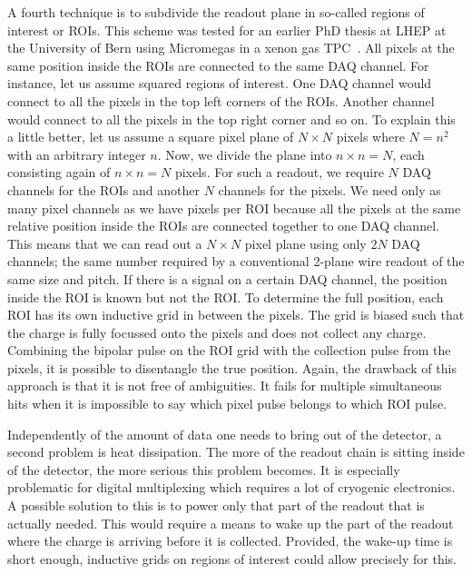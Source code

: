 A fourth technique is to subdivide the readout plane in so-called regions of interest or ROIs.
This scheme was tested for an earlier PhD thesis at LHEP at the University of Bern using Micromegas in a xenon gas TPC~\cite{maplesyrup}.
All pixels at the same position inside the ROIs are connected to the same DAQ channel.
For instance, let us assume squared regions of interest.
One DAQ channel would connect to all the pixels in the top left corners of the ROIs.
Another channel would connect to all the pixels in the top right corner and so on.
To explain this a little better, let us assume a square pixel plane of $N \times N$ pixels where $N = n ^ 2$ with an arbitrary integer $n$.
Now, we divide the plane into $n \times n = N$, each consisting again of $n \times n = N$ pixels.
For such a readout, we require $N$ DAQ channels for the ROIs and another $N$ channels for the pixels.
We need only as many pixel channels as we have pixels per ROI because all the pixels at the same relative position inside the ROIs are connected together to one DAQ channel.
This means that we can read out a $N \times N$ pixel plane using only $2 N$ DAQ channels; the same number required by a conventional 2-plane wire readout of the same size and pitch.
If there is a signal on a certain DAQ channel, the position inside the ROI is known but not the ROI.
To determine the full position, each ROI has its own inductive grid in between the pixels.
The grid is biased such that the charge is fully focussed onto the pixels and does not collect any charge.
Combining the bipolar pulse on the ROI grid with the collection pulse from the pixels, it is possible to disentangle the true position.
Again, the drawback of this approach is that it is not free of ambiguities.
It fails for multiple simultaneous hits when it is impossible to say which pixel pulse belongs to which ROI pulse.

Independently of the amount of data one needs to bring out of the detector, a second problem is heat dissipation.
The more of the readout chain is sitting inside of the detector, the more serious this problem becomes.
It is especially problematic for digital multiplexing which requires a lot of cryogenic electronics.
A possible solution to this is to power only that part of the readout that is actually needed.
This would require a means to wake up the part of the readout where the charge is arriving before it is collected.
Provided, the wake-up time is short enough, inductive grids on regions of interest could allow precisely for this.

